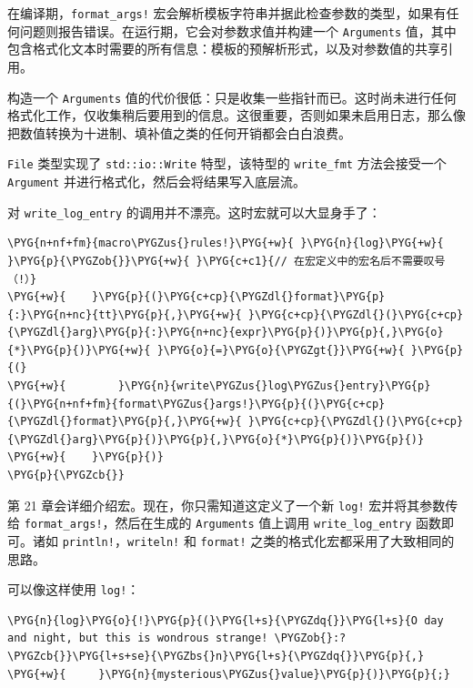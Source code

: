 在编译期，\texttt{format\_args!} 宏会解析模板字符串并据此检查参数的类型，如果有任何问题则报告错误。在运行期，它会对参数求值并构建一个 \texttt{Arguments} 值，其中包含格式化文本时需要的所有信息：模板的预解析形式，以及对参数值的共享引用。

构造一个 \texttt{Arguments} 值的代价很低：只是收集一些指针而已。这时尚未进行任何格式化工作，仅收集稍后要用到的信息。这很重要，否则如果未启用日志，那么像把数值转换为十进制、填补值之类的任何开销都会白白浪费。

\texttt{File} 类型实现了 \texttt{std::io::Write} 特型，该特型的 \texttt{write\_fmt} 方法会接受一个 \texttt{Argument} 并进行格式化，然后会将结果写入底层流。

对 \texttt{write\_log\_entry} 的调用并不漂亮。这时宏就可以大显身手了：

\begin{Verbatim}[commandchars=\\\{\},breaklines=true,breakanywhere=true,fontsize=\codefont,xleftmargin=17bp]
\PYG{n+nf+fm}{macro\PYGZus{}rules!}\PYG{+w}{ }\PYG{n}{log}\PYG{+w}{ }\PYG{p}{\PYGZob{}}\PYG{+w}{ }\PYG{c+c1}{// 在宏定义中的宏名后不需要叹号（!）}
\PYG{+w}{    }\PYG{p}{(}\PYG{c+cp}{\PYGZdl{}format}\PYG{p}{:}\PYG{n+nc}{tt}\PYG{p}{,}\PYG{+w}{ }\PYG{c+cp}{\PYGZdl{}(}\PYG{c+cp}{\PYGZdl{}arg}\PYG{p}{:}\PYG{n+nc}{expr}\PYG{p}{)}\PYG{p}{,}\PYG{o}{*}\PYG{p}{)}\PYG{+w}{ }\PYG{o}{=}\PYG{o}{\PYGZgt{}}\PYG{+w}{ }\PYG{p}{(}
\PYG{+w}{        }\PYG{n}{write\PYGZus{}log\PYGZus{}entry}\PYG{p}{(}\PYG{n+nf+fm}{format\PYGZus{}args!}\PYG{p}{(}\PYG{c+cp}{\PYGZdl{}format}\PYG{p}{,}\PYG{+w}{ }\PYG{c+cp}{\PYGZdl{}(}\PYG{c+cp}{\PYGZdl{}arg}\PYG{p}{)}\PYG{p}{,}\PYG{o}{*}\PYG{p}{)}\PYG{p}{)}
\PYG{+w}{    }\PYG{p}{)}
\PYG{p}{\PYGZcb{}}
\end{Verbatim}

第 21 章会详细介绍宏。现在，你只需知道这定义了一个新 \texttt{log!} 宏并将其参数传给 \texttt{format\_args!}，然后在生成的 \texttt{Arguments} 值上调用 \texttt{write\_log\_entry} 函数即可。诸如 \texttt{println!}，\texttt{writeln!} 和 \texttt{format!} 之类的格式化宏都采用了大致相同的思路。

可以像这样使用 \texttt{log!}：

\begin{Verbatim}[commandchars=\\\{\},breaklines=true,breakanywhere=true,fontsize=\codefont,xleftmargin=17bp]
\PYG{n}{log}\PYG{o}{!}\PYG{p}{(}\PYG{l+s}{\PYGZdq{}}\PYG{l+s}{O day and night, but this is wondrous strange! \PYGZob{}:?\PYGZcb{}}\PYG{l+s+se}{\PYGZbs{}n}\PYG{l+s}{\PYGZdq{}}\PYG{p}{,}
\PYG{+w}{     }\PYG{n}{mysterious\PYGZus{}value}\PYG{p}{)}\PYG{p}{;}
\end{Verbatim}

